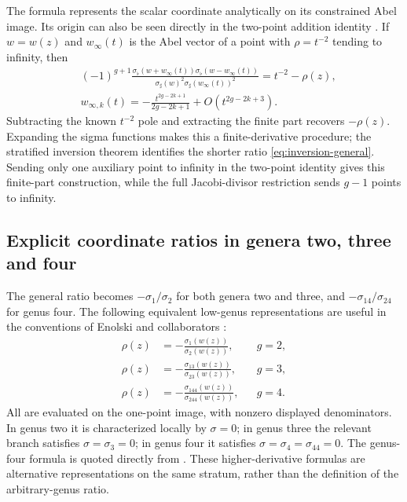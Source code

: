 \documentclass[11pt]{article}
\begin{document}
The formula represents the scalar coordinate analytically on its constrained Abel image. Its origin can also be seen directly in the two-point addition identity \cite[Lemma~7.1]{onishi}. If $w=w(z)$ and $w_\infty(t)$ is the Abel vector of a point with $\rho=t^{-2}$ tending to infinity, then
\begin{equation}\label{eq:inversion-infinity-limit}
\begin{aligned}
&(-1)^{g+1}\frac{\sigma_\flat(w+w_\infty(t))\sigma_\flat(w-w_\infty(t))}
{\sigma_\sharp(w)^2\sigma_\sharp(w_\infty(t))^2}
=t^{-2}-\rho(z),\\
&w_{\infty,k}(t)=-\frac{t^{2g-2k+1}}{2g-2k+1}
+O(t^{2g-2k+3}).
\end{aligned}
\end{equation}
Subtracting the known $t^{-2}$ pole and extracting the finite part recovers $-\rho(z)$. Expanding the sigma functions makes this a finite-derivative procedure; the stratified inversion theorem identifies the shorter ratio \eqref{eq:inversion-general}. Sending only one auxiliary point to infinity in the two-point identity gives this finite-part construction, while the full Jacobi-divisor restriction sends $g-1$ points to infinity.

\subsection{Explicit coordinate ratios in genera two, three and four}

The general ratio becomes $-\sigma_1/\sigma_2$ for both genera two and three, and $-\sigma_{14}/\sigma_{24}$ for genus four. The following equivalent low-genus representations are useful in the conventions of Enolski and collaborators \cite{enolski,thirdkind}:
\begin{align}
\rho(z)&=-\frac{\sigma_1(w(z))}{\sigma_2(w(z))},&&g=2,\label{eq:inversion-g2}\\
\rho(z)&=-\frac{\sigma_{13}(w(z))}{\sigma_{23}(w(z))},&&g=3,\label{eq:inversion-g3}\\
\rho(z)&=-\frac{\sigma_{144}(w(z))}{\sigma_{244}(w(z))},&&g=4.\label{eq:inversion-g4}
\end{align}
All are evaluated on the one-point image, with nonzero displayed denominators. In genus two it is characterized locally by $\sigma=0$; in genus three the relevant branch satisfies $\sigma=\sigma_3=0$; in genus four it satisfies $\sigma=\sigma_4=\sigma_{44}=0$. The genus-four formula is quoted directly from \cite[Eq.~VII.18]{thirdkind}. These higher-derivative formulas are alternative representations on the same stratum, rather than the definition of the arbitrary-genus ratio.
\end{document}
